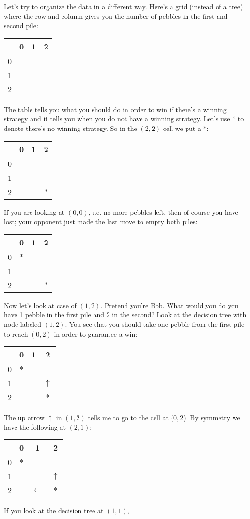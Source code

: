 Let's try to organize the data in a different way.
Here's a grid (instead of a tree) where the row and column gives you
the number of pebbles in the first and second pile:
\begin{longtable}{|c|ccc|} \hline
  & 0 & 1 & 2 \\
\hline
0 &  &  &  \\
1 &  &  &  \\
2 &  &  &  \\
\hline
\end{longtable}
The table tells you what you should do in order to win 
if there's a winning strategy and it tells you when you do not have
a winning strategy.
Let's use $*$ to denote there's no winning strategy.
So in the $(2,2)$ cell we put a $*$:
\begin{longtable}{|c|ccc|} \hline
  & 0 & 1 & 2 \\
\hline
0 &  &  &  \\
1 &  &  &  \\
2 &  &  &  $*$ \\
\hline
\end{longtable}
If you are looking at $(0,0)$, i.e. no more pebbles left,
then of course you have lost; your opponent just made the last
move to empty both piles:
\begin{longtable}{|c|ccc|} \hline
  & 0 & 1 & 2 \\
\hline
0 & $*$ &  &  \\
1 &  &  &  \\
2 &  &  &  $*$ \\
\hline
\end{longtable}
Now let's look at case of $(1,2)$. 
Pretend you're Bob.
What would you do you have 1 pebble in the first pile and
2 in the second?
Look at the decision tree with node labeled $(1,2)$.
You see that you should take one pebble from the first pile
to reach $(0,2)$ in order to guarantee a win:
\begin{longtable}{|c|ccc|} \hline
  & 0   & 1 & 2 \\ \hline
0 & $*$ &   &  \\
1 &     &   &  $\uparrow$ \\
2 &     &   &  $*$ \\
\hline
\end{longtable}
The up arrow $\uparrow$ in $(1,2)$ tells me to go to the cell
at $(0,2$).
By symmetry we have the following at $(2,1)$:
\begin{longtable}{|c|ccc|} \hline
  & 0   & 1 & 2 \\ \hline
0 & $*$ &   &  \\
1 &     &   &  $\uparrow$ \\
2 &     & $\leftarrow$  &  $*$ \\
\hline
\end{longtable}
If you look at the decision tree at $(1,1)$,

